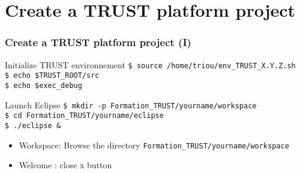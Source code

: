 \documentclass[10pt, hyperref={unicode=true,pdfusetitle, bookmarks=true,bookmarksnumbered=false,bookmarksopen=false, breaklinks=false,pdfborder={0 0 1},backref=true,colorlinks=true,linkcolor=darkblue,pageanchor, urlcolor=darkblue}]{beamer}
\begin{document}
\section{{\bf{Create a TRUST platform project}}}
\begin{frame}
\tableofcontents[sections={1-5},currentsection, currentsubsection]
\end{frame}
\begin{frame}
\frametitle{Create a TRUST platform project (I)}

\begin{block}{Initialize TRUST environnement}
\texttt{\$ source /home/triou/env\_TRUST\_X.Y.Z.sh} \\
\texttt{\$ echo \$TRUST\_ROOT/src} \\
\texttt{\$ echo \$exec\_debug} \\
\end{block}

\begin{block}{Launch Eclipse}
\texttt{\$ mkdir -p Formation\_TRUST/yourname/workspace}\\
\texttt{\$ cd Formation\_TRUST/yourname/eclipse}\\
\texttt{\$ ./eclipse \&}
%
\begin{itemize}
\item Workspace: Browse the directory \texttt{Formation\_TRUST/yourname/workspace} 
\item Welcome : close x button
\end{itemize}
%
\end{block}

\end{frame}
\end{document}
